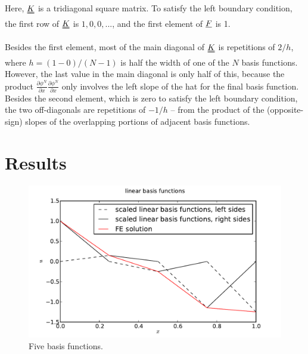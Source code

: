 \documentclass[10pt]{article}
\begin{document}
Here, $\uuline{K}$ is a tridiagonal square matrix. To satisfy the left boundary condition, the first row of $\uuline{K}$ is $1, 0, 0, ...$, and the first element of $\uline F$ is 1.

Besides the first element, most of the main diagonal of $\uuline K$ is repetitions of $2 / h$, where $h = (1 - 0) / (N - 1)$ is half the width of one of the $N$ basis functions. However, the last value in the main diagonal is only half of this, because the product $\frac{\partial \phi^N}{\partial x} \frac{\partial \phi^N}{\partial x}$ only involves the left slope of the hat for the final basis function. Besides the second element, which is zero to satisfy the left boundary condition, the two off-diagonals are repetitions of $-1 / h$ -- from the product of the (opposite-sign) slopes of the overlapping portions of adjacent basis functions.

\section{Results}
\label{sec:results}

\begin{figure}[ht]
    \centering
    \includegraphics[width=\columnwidth,keepaspectratio=true]{./hw7-basis_functions-N5.pdf}
    \caption{Five basis functions.}
    \label{fig:N5}
\end{figure}
\end{document}
